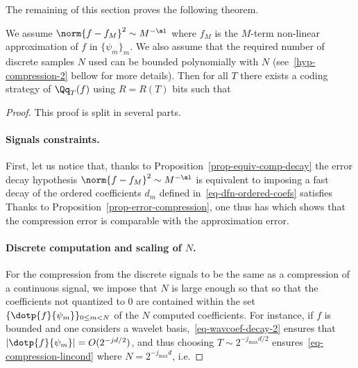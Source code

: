 The remaining of this section proves the following theorem.

\begin{thm}\label{thm-compression}
	We assume $\norm{f-f_M}^2 \sim M^{-\al}$ where $f_M$ is the $M$-term non-linear approximation of $f$ in $\{\psi_m\}_m$.
	We also assume that the required number of discrete samples $N$ used can be bounded polynomially with $N$ (see~\eqref{hyp-compression-2} bellow for more details).
	Then for all $T$ there exists a coding strategy of $\Qq_T(f)$ using $R=R(T)$ bits such that 
\end{thm}


\begin{proof} This proof is split in several parts.

\paragraph{Signals constraints.}

First, let us notice that, thanks to Proposition~\ref{prop-equiv-comp-decay} the error decay hypothesis $\norm{f-f_M}^2 \sim M^{-\al}$ is equivalent to imposing a fast decay of the ordered coefficients $d_m$ defined in~\eqref{eq-dfn-ordered-coefs} satisfies 
Thanks to Proposition~\ref{prop-error-compression}, one thus has
which shows that the compression error is comparable with the approximation error. 

\paragraph{Discrete computation and scaling of $N$.}
 
For the compression from the discrete signals to be the same as a compression of a continuous signal, we impose that $N$ is large enough so that 
so that the coefficients not quantized to $0$ are contained within the set $\{ \dotp{f}{\psi_m} \}_{0 \leq m < N}$ of the $N$ computed coefficients.
%
For instance, if $f$ is bounded and one considers a wavelet basis,~\eqref{eq-wavcoef-decay-2} ensures that $|\dotp{f}{\psi_m}|=O(2^{-jd/2})$, and thus choosing $T \sim 2^{-j_{\max} d/2}$ ensures~\eqref{eq-compression-lincond} where $N=2^{-j_{\max}d}$, i.e. 


\end{proof}
